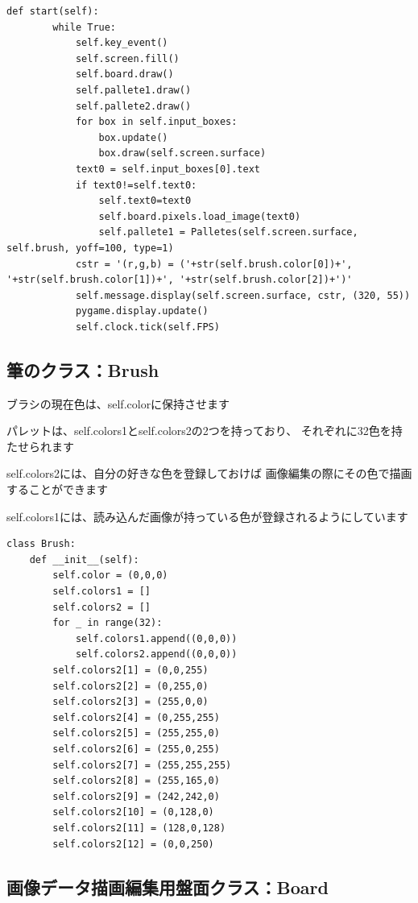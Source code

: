 \documentclass[uplatex,a4paper,11pt,oneside,openany]{jsbook}
\begin{document}
\begin{lstlisting}[caption=class Editor,label=pr02]
    def start(self):
        while True:
            self.key_event()
            self.screen.fill()
            self.board.draw()
            self.pallete1.draw()
            self.pallete2.draw()
            for box in self.input_boxes:
                box.update()
                box.draw(self.screen.surface)
            text0 = self.input_boxes[0].text
            if text0!=self.text0:
                self.text0=text0
                self.board.pixels.load_image(text0)
                self.pallete1 = Palletes(self.screen.surface, self.brush, yoff=100, type=1)
            cstr = '(r,g,b) = ('+str(self.brush.color[0])+', '+str(self.brush.color[1])+', '+str(self.brush.color[2])+')'
            self.message.display(self.screen.surface, cstr, (320, 55))
            pygame.display.update()
            self.clock.tick(self.FPS)
\end{lstlisting}

\subsection{筆のクラス：Brush}

ブラシの現在色は、self.colorに保持させます

パレットは、self.colors1とself.colors2の2つを持っており、
それぞれに32色を持たせられます

self.colors2には、自分の好きな色を登録しておけば
画像編集の際にその色で描画することができます

self.colors1には、読み込んだ画像が持っている色が登録されるようにしています

\begin{lstlisting}[caption=class Brush,label=pr04]
class Brush:
    def __init__(self):
        self.color = (0,0,0)
        self.colors1 = []
        self.colors2 = []
        for _ in range(32):
            self.colors1.append((0,0,0))
            self.colors2.append((0,0,0))
        self.colors2[1] = (0,0,255)
        self.colors2[2] = (0,255,0)
        self.colors2[3] = (255,0,0)
        self.colors2[4] = (0,255,255)
        self.colors2[5] = (255,255,0)
        self.colors2[6] = (255,0,255)
        self.colors2[7] = (255,255,255)
        self.colors2[8] = (255,165,0)
        self.colors2[9] = (242,242,0)
        self.colors2[10] = (0,128,0)
        self.colors2[11] = (128,0,128)
        self.colors2[12] = (0,0,250)
\end{lstlisting}

\subsection{画像データ描画編集用盤面クラス：Board}
\end{document}

